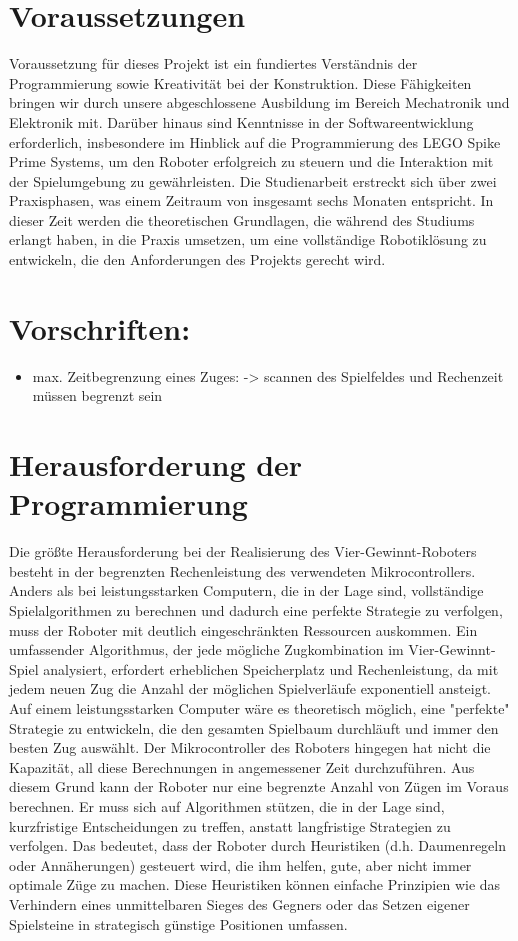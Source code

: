 \section{Voraussetzungen}
Voraussetzung für dieses Projekt ist ein fundiertes Verständnis der Programmierung sowie Kreativität bei der Konstruktion. Diese Fähigkeiten bringen wir durch unsere abgeschlossene Ausbildung im Bereich Mechatronik und Elektronik mit. Darüber hinaus sind Kenntnisse in der Softwareentwicklung erforderlich, insbesondere im Hinblick auf die Programmierung des LEGO Spike Prime Systems, um den Roboter erfolgreich zu steuern und die Interaktion mit der Spielumgebung zu gewährleisten.
Die Studienarbeit erstreckt sich über zwei Praxisphasen, was einem Zeitraum von insgesamt sechs Monaten entspricht. In dieser Zeit werden die theoretischen Grundlagen, die während des Studiums erlangt haben, in die Praxis umsetzen, um eine vollständige Robotiklösung zu entwickeln, die den Anforderungen des Projekts gerecht wird.


\section{Vorschriften:}
\begin{itemize}
\item max. Zeitbegrenzung eines Zuges: -> scannen des Spielfeldes und Rechenzeit müssen begrenzt sein
\end{itemize}


\section{Herausforderung der Programmierung}
Die größte Herausforderung bei der Realisierung des Vier-Gewinnt-Roboters besteht in der begrenzten Rechenleistung des verwendeten Mikrocontrollers. Anders als bei leistungsstarken Computern, die in der Lage sind, vollständige Spielalgorithmen zu berechnen und dadurch eine perfekte Strategie zu verfolgen, muss der Roboter mit deutlich eingeschränkten Ressourcen auskommen.
Ein umfassender Algorithmus, der jede mögliche Zugkombination im Vier-Gewinnt-Spiel analysiert, erfordert erheblichen Speicherplatz und Rechenleistung, da mit jedem neuen Zug die Anzahl der möglichen Spielverläufe exponentiell ansteigt. Auf einem leistungsstarken Computer wäre es theoretisch möglich, eine "perfekte" Strategie zu entwickeln, die den gesamten Spielbaum durchläuft und immer den besten Zug auswählt. Der Mikrocontroller des Roboters hingegen hat nicht die Kapazität, all diese Berechnungen in angemessener Zeit durchzuführen.
Aus diesem Grund kann der Roboter nur eine begrenzte Anzahl von Zügen im Voraus berechnen. Er muss sich auf Algorithmen stützen, die in der Lage sind, kurzfristige Entscheidungen zu treffen, anstatt langfristige Strategien zu verfolgen. Das bedeutet, dass der Roboter durch Heuristiken (d.h. Daumenregeln oder Annäherungen) gesteuert wird, die ihm helfen, gute, aber nicht immer optimale Züge zu machen. Diese Heuristiken können einfache Prinzipien wie das Verhindern eines unmittelbaren Sieges des Gegners oder das Setzen eigener Spielsteine in strategisch günstige Positionen umfassen.


